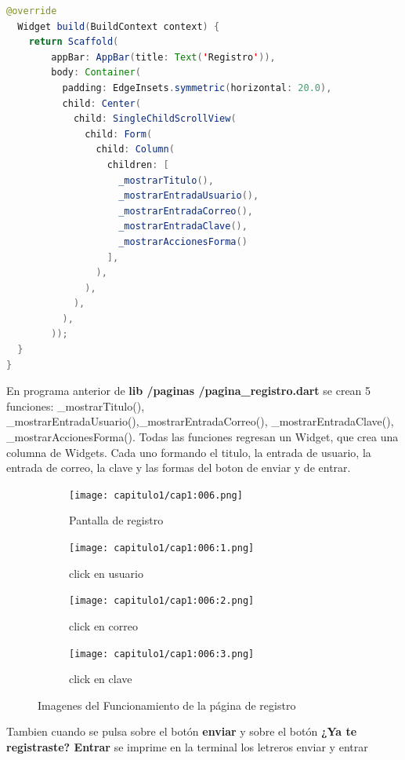 \begin{lstlisting}[language=java]
  @override
  Widget build(BuildContext context) {
    return Scaffold(
        appBar: AppBar(title: Text('Registro')),
        body: Container(
          padding: EdgeInsets.symmetric(horizontal: 20.0),
          child: Center(
            child: SingleChildScrollView(
              child: Form(
                child: Column(
                  children: [
                    _mostrarTitulo(),
                    _mostrarEntradaUsuario(),
                    _mostrarEntradaCorreo(),
                    _mostrarEntradaClave(),
                    _mostrarAccionesForma()
                  ],
                ),
              ),
            ),
          ),
        ));
  }
}

\end{lstlisting}

En programa anterior de \textbf{lib /paginas /pagina\_registro.dart} se crean 5 funciones: \_mostrarTitulo(), \_mostrarEntradaUsuario(),\_mostrarEntradaCorreo(), \_mostrarEntradaClave(), \_mostrarAccionesForma(). Todas las funciones regresan un Widget, que crea una columna de Widgets. Cada uno formando el titulo, la entrada de usuario, la entrada de correo, la clave y las formas del boton de enviar y de entrar.

\begin{figure}
\begin{subfigure}{.5\textwidth}
  \centering
  \texttt{[image: capitulo1/cap1:006.png]}
  \caption{Pantalla de registro}
  \label{cap1:006:sfig1}
\end{subfigure}%
\begin{subfigure}{.5\textwidth}
  \centering
  \texttt{[image: capitulo1/cap1:006:1.png]}
  \caption{click en usuario}
  \label{cap1:006:sfig2}
\end{subfigure}
\begin{subfigure}{.5\textwidth}
  \centering
  \texttt{[image: capitulo1/cap1:006:2.png]}
  \caption{click en correo}
  \label{cap1:006:sfig3}
\end{subfigure}
\begin{subfigure}{.5\textwidth}
  \centering
  \texttt{[image: capitulo1/cap1:006:3.png]}
  \caption{click en clave}
  \label{cap1:006:sfig4}
\end{subfigure}
\caption{Imagenes del Funcionamiento de la página de registro}
\label{cap1:006}
\end{figure}

Tambien cuando se pulsa sobre el botón \textbf{enviar} y sobre el botón \textbf{¿Ya te registraste? Entrar} se imprime en la terminal los letreros enviar y entrar 

